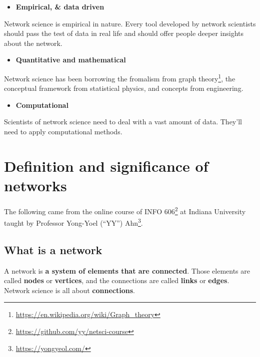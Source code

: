 \documentclass[
]{krantz}
\makeatletter
\providecommand{\tightlist}{%
  \setlength{\itemsep}{0pt}\setlength{\parskip}{0pt}}
\renewcommand{\href}[2]{#2\footnote{\url{#1}}}
\newenvironment{kframe}{%
\medskip{}
\setlength{\fboxsep}{.8em}
 \def\at@end@of@kframe{}%
 \ifinner\ifhmode%
  \def\at@end@of@kframe{\end{minipage}}%
  \begin{minipage}{\columnwidth}%
 \fi\fi%
 \def\FrameCommand##1{\hskip\@totalleftmargin \hskip-\fboxsep
 \colorbox{shadecolor}{##1}\hskip-\fboxsep
     \hskip-\linewidth \hskip-\@totalleftmargin \hskip\columnwidth}%
 \MakeFramed {\advance\hsize-\width
   \@totalleftmargin\z@ \linewidth\hsize
   \@setminipage}}%
 {\par\unskip\endMakeFramed%
 \at@end@of@kframe}
\newenvironment{rmdblock}[1]
  {
  \begin{itemize}
  \renewcommand{\labelitemi}{
    \raisebox{-.7\height}[0pt][0pt]{
      {\setkeys{Gin}{width=3em,keepaspectratio}\texttt{[image: images/\#1]}}
    }
  }
  \setlength{\fboxsep}{1em}
  \begin{kframe}
  \item
  }
  {
  \end{kframe}
  \end{itemize}
  }
\newenvironment{rmdnote}
  {\begin{rmdblock}{note}}
  {\end{rmdblock}}
\makeatother
\begin{document}
\begin{itemize}
\tightlist
\item
  \textbf{Empirical, \& data driven}
\end{itemize}

Network science is empirical in nature. Every tool developed by network scientists should pass the test of data in real life and should offer people deeper insights about the network.

\begin{itemize}
\tightlist
\item
  \textbf{Quantitative and mathematical}
\end{itemize}

Network science has been borrowing the fromalism from \href{https://en.wikipedia.org/wiki/Graph_theory}{graph theory}, the conceptual framework from statistical physics, and concepts from engineering.

\begin{itemize}
\tightlist
\item
  \textbf{Computational}
\end{itemize}

Scientists of network science need to deal with a vast amount of data. They'll need to apply computational methods.

\hypertarget{definition-and-significance-of-networks}{%
\section{Definition and significance of networks}\label{definition-and-significance-of-networks}}

\begin{rmdnote}
The following came from the online course of \href{https://github.com/yy/netsci-course}{INFO 606} at Indiana University taught by Professor \href{https://yongyeol.com/}{Yong-Yoel (``YY'') Ahn}.
\end{rmdnote}

\hypertarget{what-is-a-network}{%
\subsection{What is a network}\label{what-is-a-network}}

A network is \textbf{a system of elements that are connected}. Those elements are called \textbf{nodes} or \textbf{vertices}, and the connections are called \textbf{links} or \textbf{edges}. Network science is all about \textbf{connections}.
\end{document}
